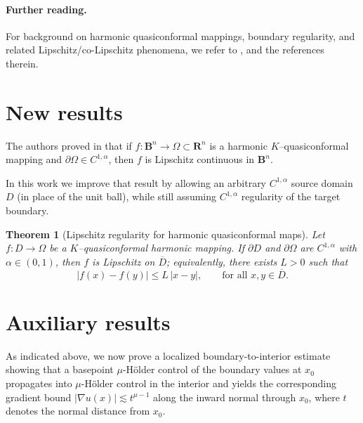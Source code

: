\documentclass{amsart}
\newtheorem{theorem}{Theorem}[section]
\begin{document}
\paragraph{\textbf{Further reading.}}
For background on harmonic quasiconformal mappings, boundary regularity, and related
Lipschitz/co-Lipschitz phenomena, we refer to
\cite{Martio1969,Pavlovic2002,PartykaSakan2007,PartykaSakanZhu2018,MateljevicVuorinen2010,
Manojlovic2009,ArsenovicKojicMateljevic2008,BozinMateljevic2015,Todorcevic2019,
ClunieSheilSmall1984,AstalaIwaniecMartin2009,
Kalaj2003Convex,Kalaj2004Convex,KalajPavlovic2005HalfPlane,KalajMateljevic2006Inner,
Kalaj2008MZ,Kalaj2008Ball,KalajPavlovic2011,Kalaj2011Distance,Kalaj2011Kneser,
KalajMateljevic2011PA,KalajVuorinen2012,Kalaj2013Gradient,KalajPonnusamyVuorinen2014,
Kalaj2015Muckenhoupt,Kalaj2016HeinzSchwarz,Kalaj2017Dini,KalajSaksman2019, Gjokaj, 
KalajZlaticanin2019,Kalaj2019Riesz,Kalaj2022RMI},
and the references therein.
\section{New results}
The authors  proved in \cite{GjokajKalaj2022} that if $f:\mathbf{B}^n\to\Omega\subset\mathbf{R}^n$
is a harmonic $K$--quasiconformal mapping and $\partial\Omega\in C^{1,\alpha}$,
then $f$ is Lipschitz continuous in $\mathbf{B}^n$.

In this work we improve that result by allowing an arbitrary $C^{1,\alpha}$ source domain $D$
(in place of the unit ball), while still assuming $C^{1,\alpha}$ regularity of the target boundary.

\begin{theorem}[Lipschitz regularity for harmonic quasiconformal maps]\label{thm:lipschitz_C1a}
Let $f:D\to\Omega$ be a $K$--quasiconformal harmonic mapping.
If $\partial D$ and $\partial\Omega$ are $C^{1,\alpha}$ with $\alpha\in(0,1)$, then $f$ is Lipschitz
on $\overline D$; equivalently, there exists $L>0$ such that
\[
|f(x)-f(y)|\le L\,|x-y|,\qquad \text{for all }x,y\in \overline D.
\]
\end{theorem}

\section{Auxiliary results}\label{sec:lipschitz}

\noindent As indicated above, we now prove a localized boundary-to-interior estimate showing that a basepoint
$\mu$-H\"older control of the boundary values at $x_0$ propagates into $\mu$-H\"older control in the interior and
yields the corresponding gradient bound $|\nabla u(x)|\lesssim t^{\mu-1}$ along the inward normal through $x_0$,
where $t$ denotes the normal distance from $x_0$.
\end{document}
